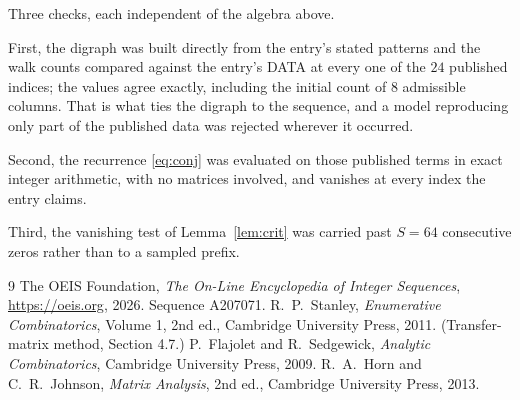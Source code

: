 \documentclass[11pt,a4paper]{article}
\theoremstyle{plain}
\theoremstyle{definition}
\begin{document}
Three checks, each independent of the algebra above.

First, the digraph was built directly from the entry's stated patterns and the walk counts
compared against the entry's DATA at every one of the $24$ published indices; the
values agree exactly, including the initial count of $8$ admissible columns. That is
what ties the digraph to the sequence, and a model reproducing only part of the published
data was rejected wherever it occurred.

Second, the recurrence \eqref{eq:conj} was evaluated on those published terms in exact
integer arithmetic, with no matrices involved, and vanishes at every index the entry claims.

Third, the vanishing test of Lemma~\ref{lem:crit} was carried past $S=64$ consecutive
zeros rather than to a sampled prefix.

\begin{thebibliography}{9}
 The OEIS Foundation, \emph{The On-Line Encyclopedia of Integer
Sequences}, \url{https://oeis.org}, 2026. Sequence A207071.
 R.~P.~Stanley, \emph{Enumerative Combinatorics}, Volume 1, 2nd ed.,
Cambridge University Press, 2011. (Transfer-matrix method, Section 4.7.)
 P.~Flajolet and R.~Sedgewick, \emph{Analytic Combinatorics}, Cambridge
University Press, 2009.
 R.~A.~Horn and C.~R.~Johnson, \emph{Matrix Analysis}, 2nd ed., Cambridge
University Press, 2013.
\end{thebibliography}
\end{document}

